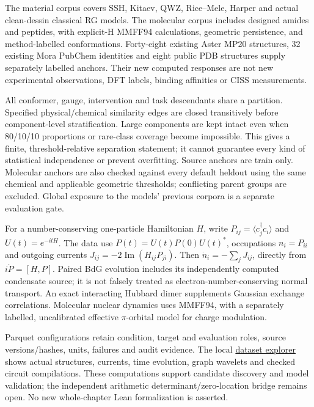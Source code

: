 \documentclass[11pt]{article}
\theoremstyle{definition}\newtheorem{definition}[theorem]{Definition}
\theoremstyle{remark}\newtheorem{remark}[theorem]{Remark}
\begin{document}
The material corpus covers SSH, Kitaev, QWZ, Rice--Mele, Harper and actual
clean-dessin classical RG models. The molecular corpus includes designed
amides and peptides, with explicit-H MMFF94 calculations, geometric persistence,
and method-labelled conformations. Forty-eight existing Aster MP20 structures,
32 existing Mora PubChem identities and eight public PDB structures supply
separately labelled anchors. Their new computed responses are not new
experimental observations, DFT labels, binding affinities or CISS measurements.

All conformer, gauge, intervention and task descendants share a partition.
Specified physical/chemical similarity edges are closed transitively before
component-level stratification. Large components are kept intact even when
80/10/10 proportions or rare-class coverage become impossible. This gives a
finite, threshold-relative separation statement; it cannot guarantee every
kind of statistical independence or prevent overfitting. Source anchors are
train only. Molecular anchors are also checked against every default heldout
using the same chemical and applicable geometric thresholds; conflicting parent
groups are excluded. Global exposure to the models' previous corpora is a separate
evaluation gate.

For a number-conserving one-particle Hamiltonian $H$, write
$P_{ij}=\langle c_j^\dagger c_i\rangle$ and $U(t)=e^{-itH}$.
The data use $P(t)=U(t)P(0)U(t)^*$, occupations $n_i=P_{ii}$ and
outgoing currents $J_{ij}=-2\operatorname{Im}(H_{ij}P_{ji})$.
Then $\dot n_i=-\sum_jJ_{ij}$, directly from $i\dot P=[H,P]$.
Paired BdG evolution includes its independently computed condensate source;
it is not falsely treated as electron-number-conserving normal transport.
An exact interacting Hubbard dimer supplements Gaussian exchange correlations.
Molecular nuclear dynamics uses MMFF94, with a separately labelled,
uncalibrated effective $\pi$-orbital model for charge modulation.

Parquet configurations retain condition, target and evaluation roles, source
versions/hashes, units, failures and audit evidence. The local
\href{http://127.0.0.1:8765/datasets.html}{dataset explorer} shows actual
structures, currents, time evolution, graph wavelets and checked circuit
compilations. These computations support candidate discovery and model
validation; the independent arithmetic determinant/zero-location bridge remains
open. No new whole-chapter Lean formalization is asserted.

\let\standardappendix\appendix
\renewcommand{\appendix}{\standardappendix{}}
\appendix
\end{document}
